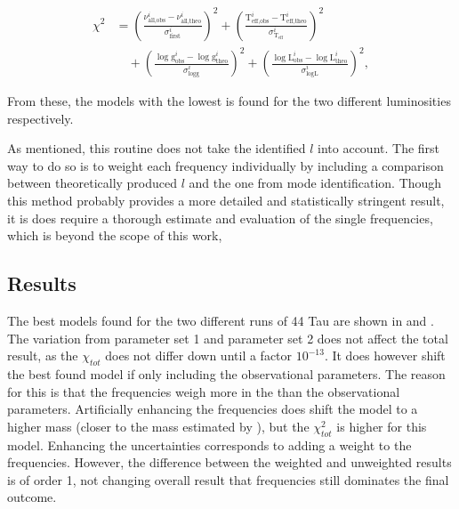 \begin{align}
\chi^2 &= \left(\frac{\nu_{\text{all,obs}}^i-\nu^i_{\text{all,theo}}}{\sigma^i_{\text{first}}}\right)^2
 +
         \left(\frac{\text{T}_\text{eff,obs}^i-\text{T}_\text{eff,theo}^i}{\sigma^i_{\text{T}_\text{eff}}}\right)^2  \nonumber \\
  & \quad +
\left(\frac{\log \text{g}_\text{obs}^i-\log \text{g}_\text{theo}^i}{\sigma^i_{\log \text{g}}}\right)^2  + \left(\frac{\log \text{L}_\text{obs}^i-\log \text{L}_\text{theo}^i}{\sigma^i_{\log \text{L}}}\right)^2, 
 \label{eq:chis_all}
\end{align}

From these, the models with the lowest \chis is found for the two different luminosities respectively.

As mentioned, this routine does not take the identified $l$ into account. The first way to do so is to weight each frequency individually by including a comparison between theoretically produced $l$ and the one from mode identification. Though this method probably provides a more detailed and statistically stringent result, it is does require a thorough estimate and evaluation of the single frequencies, which is beyond the scope of this work,


\subsection{Results}
The best models found for the two different runs of 44 Tau are shown in  and . The variation from parameter set 1 and parameter set 2 does not affect the total result, as the $\chi_{tot}$ does not differ down until a factor $10^{-13}$. It does however shift the best found model if only including the observational parameters. The reason for this is that the frequencies weigh more in the \chis than the observational parameters. Artificially enhancing the frequencies does shift the model to a higher mass (closer to the mass estimated by \citet{lenz2010delta}), but the $\chi_{ tot}^2$ is higher for this model. Enhancing the uncertainties corresponds to adding a weight to the frequencies. However, the difference between the weighted and unweighted results is of order 1, not changing overall result that frequencies still dominates the final outcome. 


